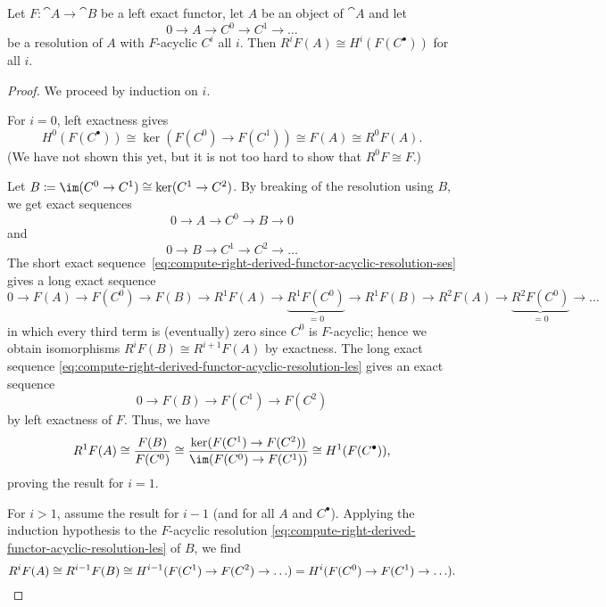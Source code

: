\begin{lem}\label{lem:compute-right-derived-functor-acyclic-resolution}
Let \(F\colon\cat A\to\cat B\) be a left exact functor, let \(A\) be an object of \(\cat A\) and let
\[0\to A\to C^0\to C^1\to\ldots\]
be a resolution of \(A\) with \(F\)-acyclic \(C^i\) all \(i\).
Then \(R^iF(A)\cong H^i(F(C^\bullet))\) for all \(i\).
\end{lem}
\begin{proof}
We proceed by induction on \(i\).

For \(i=0\), left exactness gives
\[ H^0(F(C^\bullet)) \cong \ker(F(C^0)\to F(C^1)) \cong F(A) \cong R^0F(A)\text{.} \]
(We have not shown this yet, but it is not too hard to show that \(R^0F\cong F\).)

Let \(B\coloneq\im(C^0\to C^1)\cong\ker(C^1\to C^2)\).
By breaking of the resolution using \(B\), we get exact sequences
\begin{equation}
  \label{eq:compute-right-derived-functor-acyclic-resolution-ses}
  0\to A\to C^0\to B\to 0 
\end{equation}
and
\begin{equation}
  \label{eq:compute-right-derived-functor-acyclic-resolution-les}
  0\to B\to C^1\to C^2\to \ldots
\end{equation}
The short exact sequence~\cref{eq:compute-right-derived-functor-acyclic-resolution-ses} gives a long exact sequence
\[ 0\to F(A)\to F(C^0)\to F(B)\to R^1F(A)\to \underbrace{R^1F(C^0)}_{=0}\to R^1F(B)\to R^2F(A)\to \underbrace{R^2F(C^0)}_{=0}\to \ldots \]
in which every third term is (eventually) zero since \(C^0\) is \(F\)-acyclic; hence we obtain isomorphisms \(R^iF(B)\cong R^{i+1}F(A)\) by exactness.
The long exact sequence \cref{eq:compute-right-derived-functor-acyclic-resolution-les} gives an exact sequence
\[ 0\to F(B)\to F(C^1)\to F(C^2) \]
by left exactness of \(F\).
Thus, we have
\[ R^1F(A) \cong \frac{F(B)}{F(C^0)} \cong \frac{\ker(F(C^1)\to F(C^2))}{\im(F(C^0)\to F(C^1))} \cong H^1(F(C^\bullet))\text{,} \]
proving the result for \(i=1\).

For \(i>1\), assume the result for \(i-1\) (and for all \(A\) and \(C^\bullet\)).
Applying the induction hypothesis to the \(F\)-acyclic resolution \cref{eq:compute-right-derived-functor-acyclic-resolution-les} of \(B\), we find
\[ R^iF(A) \cong R^{i-1}F(B) \cong H^{i-1}(F(C^1)\to F(C^2)\to\ldots) = H^i(F(C^0)\to F(C^1)\to\ldots)\text{.} \qedhere \]
\end{proof}

